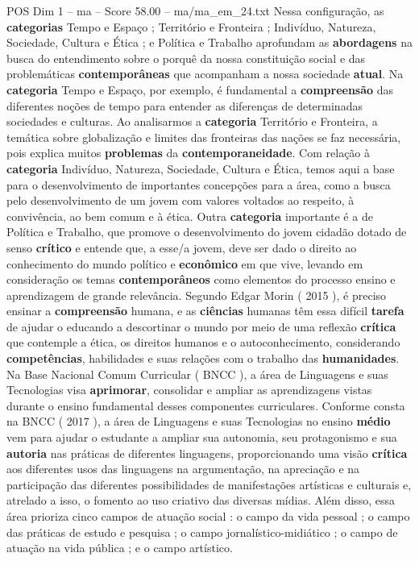 \begin{textsample}{POS Dim 1 – ma – Score 58.00 – ma/ma\_em\_24.txt}
Nessa configuração, as \textbf{categorias} Tempo e Espaço ; Território e Fronteira ; Indivíduo, Natureza, Sociedade, Cultura e Ética ; e Política e Trabalho aprofundam as \textbf{abordagens} na busca do entendimento sobre o porquê da nossa constituição social e das problemáticas \textbf{contemporâneas} que acompanham a nossa sociedade \textbf{atual}.
Na \textbf{categoria} Tempo e Espaço, por exemplo, é fundamental a \textbf{compreensão} das diferentes noções de tempo para entender as diferenças de determinadas sociedades e culturas.
Ao analisarmos a \textbf{categoria} Território e Fronteira, a temática sobre globalização e limites das fronteiras das nações se faz necessária, pois explica muitos \textbf{problemas} da \textbf{contemporaneidade}.
Com relação à \textbf{categoria} Indivíduo, Natureza, Sociedade, Cultura e Ética, temos aqui a base para o desenvolvimento de importantes concepções para a área, como a busca pelo desenvolvimento de um jovem com valores voltados ao respeito, à convivência, ao bem comum e à ética.
Outra \textbf{categoria} importante é a de Política e Trabalho, que promove o desenvolvimento do jovem cidadão dotado de senso \textbf{crítico} e entende que, a esse/a jovem, deve ser dado o direito ao conhecimento do mundo político e \textbf{econômico} em que vive, levando em consideração os temas \textbf{contemporâneos} como elementos do processo ensino e aprendizagem de grande relevância.
Segundo Edgar Morin ( 2015 ), é preciso ensinar a \textbf{compreensão} humana, e as \textbf{ciências} humanas têm essa difícil \textbf{tarefa} de ajudar o educando a descortinar o mundo por meio de uma reflexão \textbf{crítica} que contemple a ética, os direitos humanos e o autoconhecimento, considerando \textbf{competências}, habilidades e suas relações com o trabalho das \textbf{humanidades}.
Na Base Nacional Comum Curricular ( BNCC ), a área de Linguagens e suas Tecnologias visa \textbf{aprimorar}, consolidar e ampliar as aprendizagens vistas durante o ensino fundamental desses componentes curriculares.
Conforme consta na BNCC ( 2017 ), a área de Linguagens e suas Tecnologias no ensino \textbf{médio} vem para ajudar o estudante a ampliar sua autonomia, seu protagonismo e sua \textbf{autoria} nas práticas de diferentes linguagens, proporcionando uma visão \textbf{crítica} aos diferentes usos das linguagens na argumentação, na apreciação e na participação das diferentes possibilidades de manifestações artísticas e culturais e, atrelado a isso, o fomento ao uso criativo das diversas mídias.
Além disso, essa área prioriza cinco campos de atuação social : o campo da vida pessoal ; o campo das práticas de estudo e pesquisa ; o campo jornalístico-midiático ; o campo de atuação na vida pública ; e o campo artístico.

\end{textsample}

